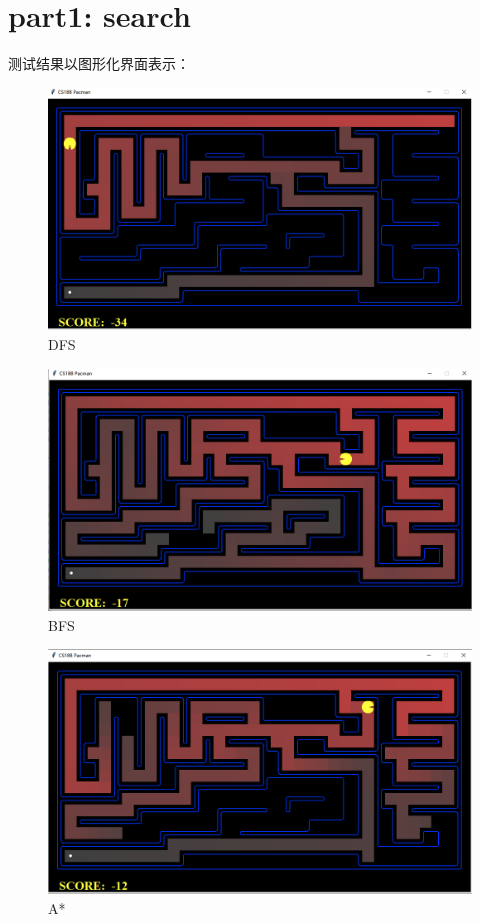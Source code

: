 \documentclass{report}
\begin{document}
    \section{part1: search}
    测试结果以图形化界面表示：
    \begin{figure}[h]
        \centering
        \includegraphics[width=15cm]{7.png}
        \caption{DFS}
    \end{figure}
    \begin{figure}[h]
        \centering
        \includegraphics[width=15cm]{8.png}
        \caption{BFS}
    \end{figure}
    \begin{figure}[h]
        \centering
        \includegraphics[width=15cm]{9.png}
        \caption{A*}
    \end{figure}
\end{document}
